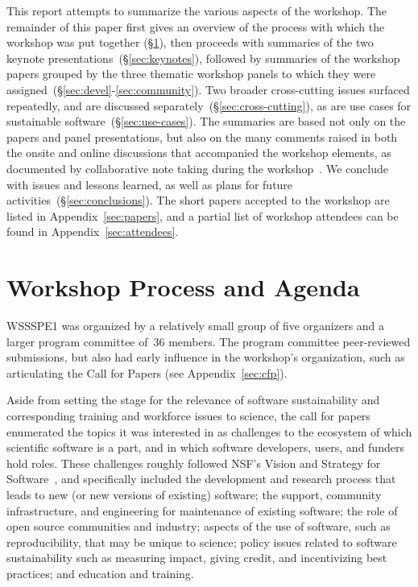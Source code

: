 \documentclass[11pt, oneside]{amsart}
\begin{document}
This report attempts to summarize the various aspects of the
workshop.  The remainder of this paper first gives an overview of the
process with which the workshop was put together
(\S\ref{sec:process}),  then proceeds with summaries of the two
keynote presentations~(\S\ref{sec:keynotes}), followed by summaries of
the workshop papers grouped by the three thematic workshop panels to which they
were assigned~(\S\ref{sec:devel}-\ref{sec:community}). Two broader
cross-cutting issues surfaced repeatedly, and are
discussed separately~(\S\ref{sec:cross-cutting}), as are
use cases for sustainable software~(\S\ref{sec:use-cases}). The
summaries are based not only on the papers and panel presentations, but
also on the many comments raised in both the onsite and online discussions
that accompanied the workshop elements, as documented by collaborative
note taking during the workshop~\cite{WSSSPE1-google-notes}. We
conclude with issues and lessons learned, as well as plans for future activities~(\S\ref{sec:conclusions}).
The short papers accepted to the workshop are listed in
Appendix~\ref{sec:papers}, and a partial list of workshop attendees
can be found in Appendix~\ref{sec:attendees}.

\section{Workshop Process and Agenda} \label{sec:process}

WSSSPE1 was organized by a relatively small group
of five organizers and a larger program committee of~36
members. The program committee peer-reviewed submissions, but also had
early influence in the workshop's organization, such as articulating
the Call for Papers (see Appendix~\ref{sec:cfp}).

Aside from setting the stage for the relevance of software
sustainability and corresponding training and workforce issues to
science,  the call for papers enumerated the topics it was interested
in as challenges to the ecosystem of which scientific software is a
part, and in which software developers, users, and funders hold
roles. These challenges roughly followed NSF's Vision and Strategy
for Software~\cite{NSF_software_vision}, and specifically included the
development and research process that leads to new (or new versions of existing)
software; the support, community infrastructure, and engineering for
maintenance of existing software; the role of open source communities
and industry; aspects of the use of software, such as
reproducibility, that may be unique to science;  policy issues
related to software sustainability such as measuring impact,
giving credit, and incentivizing best practices; and education and training.
\end{document}
